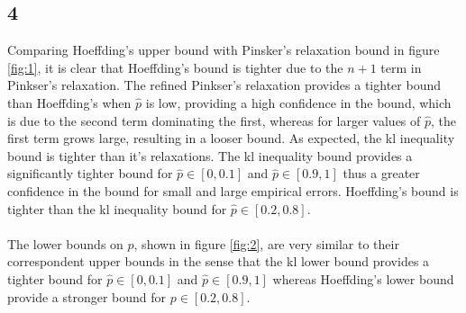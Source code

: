 \documentclass{article}
\begin{document}
\subsection{4}
Comparing Hoeffding’s upper bound with Pinsker's relaxation bound in figure \ref{fig:1}, it is clear that Hoeffding’s bound is tighter due to the $n+1$ term in Pinkser's relaxation. The refined Pinkser's relaxation provides a tighter bound than Hoeffding’s when $\hat{p}$ is low, providing a high confidence in the bound, which is due to the second term dominating the first, whereas for larger values of $\hat{p}$, the first term grows large, resulting in a looser bound. As expected, the kl inequality bound is tighter than it's relaxations. The kl inequality bound provides a significantly tighter bound for $\hat{p} \in [0,0.1]$ and $\hat{p} \in [0.9,1]$ thus a greater confidence in the bound for small and large empirical errors. Hoeffding's bound is tighter than the kl inequality bound for $\hat{p} \in [0.2,0.8]$.\\ \\
The lower bounds on $p$, shown in figure \ref{fig:2}, are very similar to their correspondent upper bounds in the sense that the kl lower bound provides a tighter bound for $\hat{p} \in [0,0.1]$ and $\hat{p} \in [0.9,1]$ whereas Hoeffding's lower bound provide a stronger bound for $p\in [0.2,0.8]$.
\end{document}
